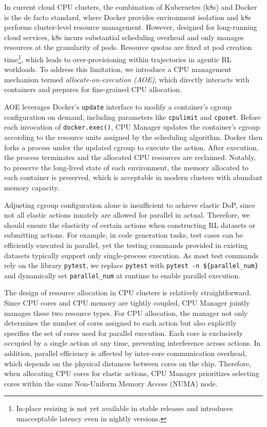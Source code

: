 In current cloud CPU clusters, the combination of Kubernetes (k8s) and Docker is the de facto standard, where Docker provides environment isolation and k8s performs cluster-level resource management. However, designed for long-running cloud services, k8s incurs substantial scheduling overhead 
and only manages resources at the granularity of pods. Resource quotas are fixed at pod creation time\footnote{In-place resizing is not yet available in stable releases and introduces unacceptable latency even in nightly versions.}, which leads to over-provisioning within trajectories in agentic RL workloads.
To address this limitation, we introduce a CPU management mechanism termed \emph{allocate-on-execution (AOE)}, which directly interacts with containers and prepares for fine-grained CPU allocation.

AOE leverages Docker’s \texttt{update} interface to modify a container’s cgroup configuration on demand, including parameters like \texttt{cpulimit} and \texttt{cpuset}. Before each invocation of \texttt{docker.exec()}, CPU Manager updates the container’s cgroup according to the resource units assigned by the scheduling algorithm. Docker then forks a process under the updated cgroup to execute the action. After execution, the process terminates and the allocated CPU resources are reclaimed.
Notably, to preserve the long-lived state of each environment, the memory allocated to each container is preserved, which is acceptable in modern clusters with abundant memory capacity.

Adjusting cgroup configuration alone is insufficient to achieve elastic DoP, since not all elastic actions innately are allowed for parallel in actual. Therefore, we should ensure the elasticity of certain actions when constructing RL datasets or submitting actions. 
For example, in code generation tasks, test cases can be efficiently executed in parallel, yet the testing commands provided in existing datasets typically support only single-process execution. As most test commands rely on the library \texttt{pytest}, we replace \texttt{pytest} with \texttt{pytest -n \$\{parallel\_num\}} and dynamically set \texttt{parallel\_num} at runtime to enable parallel execution.


The design of resource allocation in CPU clusters is relatively straightforward. Since CPU cores and CPU memory are tightly coupled, CPU Manager jointly manages these two resource types. For CPU allocation, the manager not only determines the number of cores assigned to each action but also explicitly specifies the set of cores used for parallel execution. Each core is exclusively occupied by a single action at any time, preventing interference across actions.
In addition, parallel efficiency is affected by inter-core communication overhead, which depends on the physical distances between cores on the chip. Therefore, when allocating CPU cores for elastic actions, CPU Manager prioritizes selecting cores within the same Non-Uniform Memory Access (NUMA) node.


